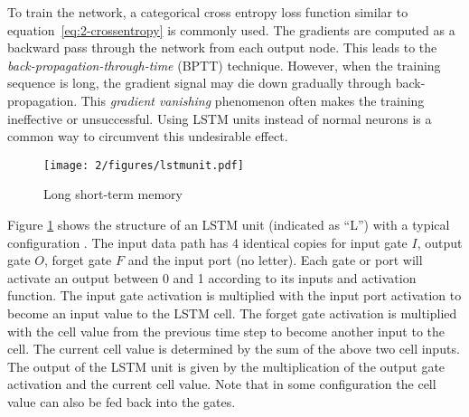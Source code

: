 To train the network, a categorical cross entropy loss function similar to equation~\ref{eq:2-crossentropy} is commonly used. The gradients are computed as a backward pass through the network from each output node. This leads to the {\it back-propagation-through-time} (BPTT) \cite{rumelhart1988parallel,werbos1990backpropagation} technique. However, when the training sequence is long, the gradient signal may die down gradually through back-propagation. This {\it gradient vanishing} \cite{bengio2009learning} phenomenon often makes the training ineffective or unsuccessful. Using LSTM units \cite{hochreiter1997long} instead of normal neurons is a common way to circumvent this undesirable effect.

\begin{figure}[htb]
\centering
\texttt{[image: 2/figures/lstmunit.pdf]}
\caption{Long short-term memory}
\label{fig:2-lstmunit}
\end{figure}
Figure \ref{fig:2-lstmunit} shows the structure of an LSTM unit (indicated as ``L'') with a typical configuration \cite{graves2012supervised}. The input data path has 4 identical copies for input gate $I$, output gate $O$, forget gate $F$ and the input port (no letter). Each gate or port will activate an output between 0 and 1 according to its inputs and activation function. The input gate activation is multiplied with the input port activation to become an input value to the LSTM cell. The forget gate activation is multiplied with the cell value from the previous time step to become another input to the cell. The current cell value is determined by the sum of the above two cell inputs. The output of the LSTM unit is given by the multiplication of the output gate activation and the current cell value. Note that in some configuration the cell value can also be fed back into the gates.

